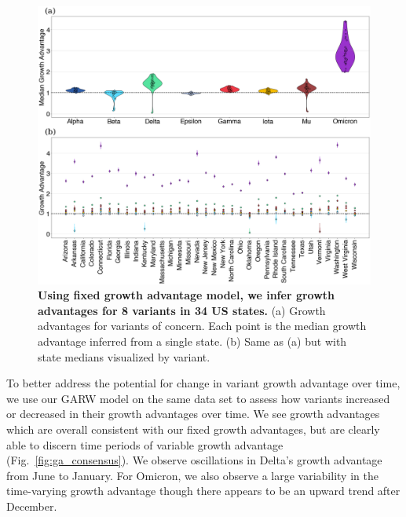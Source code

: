 \begin{figure}[h!]
  \centering
  \includegraphics[width=\linewidth]{figs/growth_advantages.png}
  \caption{\textbf{Using fixed growth advantage model, we infer growth advantages for 8 variants in 34 US states.}
  (a) Growth advantages for variants of concern. Each point is the median growth advantage inferred from a single state.
  (b) Same as (a) but with state medians visualized by variant.}
  \label{fig:growth_advantages}
\end{figure}

To better address the potential for change in variant growth advantage over time, we use our GARW model on the same data set to assess how variants increased or decreased in their growth advantages over time.
We see growth advantages which are overall consistent with our fixed growth advantages, but are clearly able to discern time periods of variable growth advantage (Fig.\ \ref{fig:ga_consensus}).
We observe oscillations in Delta's growth advantage from June to January.
For Omicron, we also observe a large variability in the time-varying growth advantage though there appears to be an upward trend after December.

